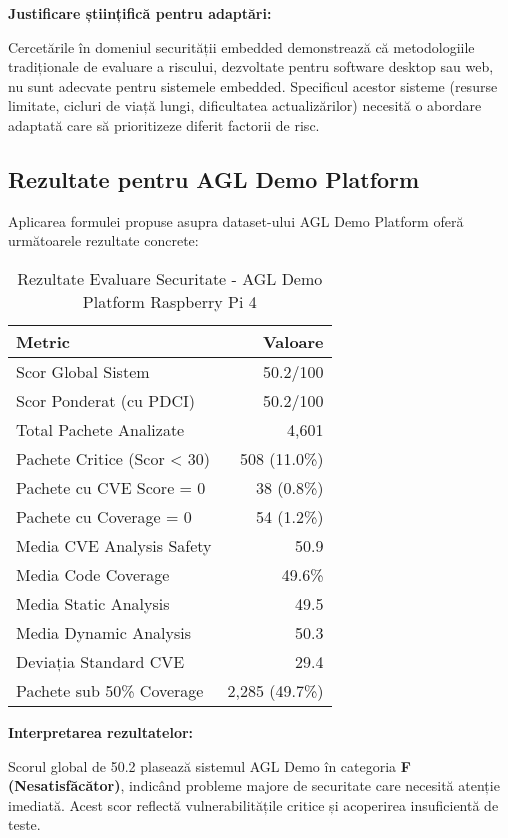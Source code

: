 \documentclass[12pt,a4paper]{article}
\begin{document}
\textbf{Justificare științifică pentru adaptări:}

Cercetările în domeniul securității embedded demonstrează că metodologiile tradiționale de evaluare a riscului, dezvoltate pentru software desktop sau web, nu sunt adecvate pentru sistemele embedded. Specificul acestor sisteme (resurse limitate, cicluri de viață lungi, dificultatea actualizărilor) necesită o abordare adaptată care să prioritizeze diferit factorii de risc.

\subsection{Rezultate pentru AGL Demo Platform}

Aplicarea formulei propuse asupra dataset-ului AGL Demo Platform oferă următoarele rezultate concrete:

\begin{table}[H]
\centering
\caption{Rezultate Evaluare Securitate - AGL Demo Platform Raspberry Pi 4}
\begin{tabular}{@{}lr@{}}
\toprule
\textbf{Metric} & \textbf{Valoare} \\
\midrule
Scor Global Sistem & 50.2/100 \\
Scor Ponderat (cu PDCI) & 50.2/100 \\
Total Pachete Analizate & 4,601 \\
Pachete Critice (Scor < 30) & 508 (11.0\%) \\
Pachete cu CVE Score = 0 & 38 (0.8\%) \\
Pachete cu Coverage = 0 & 54 (1.2\%) \\
Media CVE Analysis Safety & 50.9 \\
Media Code Coverage & 49.6\% \\
Media Static Analysis & 49.5 \\
Media Dynamic Analysis & 50.3 \\
Deviația Standard CVE & 29.4 \\
Pachete sub 50\% Coverage & 2,285 (49.7\%) \\
\bottomrule
\end{tabular}
\end{table}

\textbf{Interpretarea rezultatelor:}

Scorul global de 50.2 plasează sistemul AGL Demo în categoria \textbf{F (Nesatisfăcător)}, indicând probleme majore de securitate care necesită atenție imediată. Acest scor reflectă vulnerabilitățile critice și acoperirea insuficientă de teste.
\end{document}
